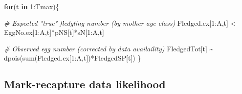 \documentclass[
]{book}
\newenvironment{Shaded}{\begin{snugshade}}{\end{snugshade}}
\newcommand{\CommentTok}[1]{\textcolor[rgb]{0.56,0.35,0.01}{\textit{#1}}}
\newcommand{\ControlFlowTok}[1]{\textcolor[rgb]{0.13,0.29,0.53}{\textbf{#1}}}
\newcommand{\DecValTok}[1]{\textcolor[rgb]{0.00,0.00,0.81}{#1}}
\newcommand{\FunctionTok}[1]{\textcolor[rgb]{0.00,0.00,0.00}{#1}}
\newcommand{\NormalTok}[1]{#1}
\newcommand{\OtherTok}[1]{\textcolor[rgb]{0.56,0.35,0.01}{#1}}
\newcommand{\SpecialCharTok}[1]{\textcolor[rgb]{0.00,0.00,0.00}{#1}}
\begin{document}
\begin{Shaded}
\begin{Highlighting}[]
\ControlFlowTok{for}\NormalTok{(t }\ControlFlowTok{in} \DecValTok{1}\SpecialCharTok{:}\NormalTok{Tmax)\{}

    \CommentTok{\# Expected "true" fledgling number (by mother age class)}
\NormalTok{    Fledged.ex[}\DecValTok{1}\SpecialCharTok{:}\NormalTok{A,t] }\OtherTok{\textless{}{-}}\NormalTok{ EggNo.ex[}\DecValTok{1}\SpecialCharTok{:}\NormalTok{A,t]}\SpecialCharTok{*}\NormalTok{pNS[t]}\SpecialCharTok{*}\NormalTok{sN[}\DecValTok{1}\SpecialCharTok{:}\NormalTok{A,t]}

    \CommentTok{\# Observed egg number (corrected by data availaility)}
\NormalTok{    FledgedTot[t] }\SpecialCharTok{\textasciitilde{}} \FunctionTok{dpois}\NormalTok{(}\FunctionTok{sum}\NormalTok{(Fledged.ex[}\DecValTok{1}\SpecialCharTok{:}\NormalTok{A,t])}\SpecialCharTok{*}\NormalTok{FledgedSP[t])}
\NormalTok{\}}
\end{Highlighting}
\end{Shaded}

\hypertarget{mark-recapture-data-likelihood}{%
\subsection{Mark-recapture data likelihood}\label{mark-recapture-data-likelihood}}
\end{document}
